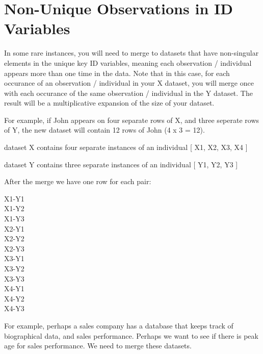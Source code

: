 \documentclass[]{book}
\theoremstyle{definition}
\theoremstyle{definition}
\theoremstyle{definition}
\theoremstyle{remark}
\begin{document}
\hypertarget{non-unique-observations-in-id-variables}{%
\section{Non-Unique Observations in ID
Variables}\label{non-unique-observations-in-id-variables}}

In some rare instances, you will need to merge to datasets that have
non-singular elements in the unique key ID variables, meaning each
observation / individual appears more than one time in the data. Note
that in this case, for each occurance of an observation / individual in
your X dataset, you will merge once with each occurance of the same
observation / individual in the Y dataset. The result will be a
multiplicative expansion of the size of your dataset.

For example, if John appears on four separate rows of X, and three
seperate rows of Y, the new dataset will contain 12 rows of John (4 x 3
= 12).

dataset X contains four separate instances of an individual {[} X1, X2,
X3, X4 {]}

dataset Y contains three separate instances of an individual {[} Y1, Y2,
Y3 {]}

After the merge we have one row for each pair:

X1-Y1\\
X1-Y2\\
X1-Y3\\
X2-Y1\\
X2-Y2\\
X2-Y3\\
X3-Y1\\
X3-Y2\\
X3-Y3\\
X4-Y1\\
X4-Y2\\
X4-Y3

For example, perhaps a sales company has a database that keeps track of
biographical data, and sales performance. Perhaps we want to see if
there is peak age for sales performance. We need to merge these
datasets.
\end{document}
